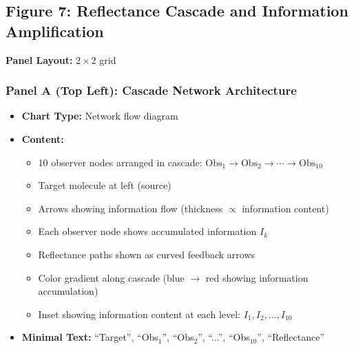 
\subsection*{Figure 7: Reflectance Cascade and Information Amplification}

\textbf{Panel Layout:} $2 \times 2$ grid

\subsubsection*{Panel A (Top Left): Cascade Network Architecture}
\begin{itemize}
\item \textbf{Chart Type:} Network flow diagram
\item \textbf{Content:}
  \begin{itemize}
  \item 10 observer nodes arranged in cascade: $\text{Obs}_1 \to \text{Obs}_2 \to \cdots \to \text{Obs}_{10}$
  \item Target molecule at left (source)
  \item Arrows showing information flow (thickness $\propto$ information content)
  \item Each observer node shows accumulated information $I_k$
  \item Reflectance paths shown as curved feedback arrows
  \item Color gradient along cascade (blue $\to$ red showing information accumulation)
  \item Inset showing information content at each level: $I_1, I_2, \ldots, I_{10}$
  \end{itemize}
\item \textbf{Minimal Text:} ``Target'', ``Obs$_1$'', ``Obs$_2$'', ``...'', ``Obs$_{10}$'', ``Reflectance''
\end{itemize}

